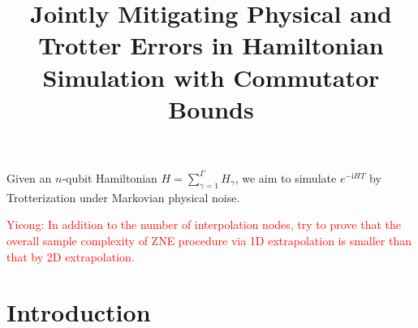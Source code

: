 \documentclass[11pt]{article}
\title{Jointly Mitigating Physical and Trotter Errors in Hamiltonian Simulation with Commutator Bounds
}
\author{}
\date{}
\renewcommand{\i}{\mathrm{i}}
\begin{document}
\maketitle

Given an $n$-qubit Hamiltonian $H = \sum_{\gamma=1}^{\Gamma} H_{\gamma}$, we aim to simulate $e^{-\i H T}$ by Trotterization under Markovian physical noise. 

\textcolor{red}{Yicong: In addition to the number of interpolation nodes, try to prove that the overall sample complexity of ZNE procedure via 1D extrapolation is smaller than that by 2D extrapolation.}

\section{Introduction}
\end{document}
